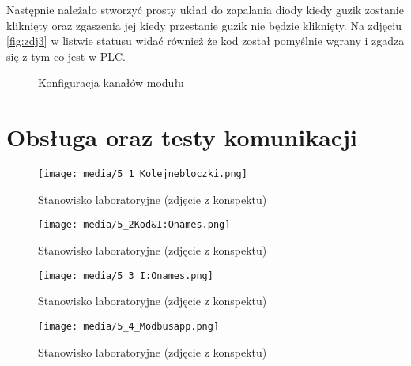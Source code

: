 \documentclass{article}
\begin{document}
\newpage
Następnie należało stworzyć prosty układ do zapalania diody kiedy guzik zostanie kliknięty oraz zgaszenia jej kiedy przestanie guzik nie będzie kliknięty. Na zdjęciu \ref{fig:zdj3} w listwie statusu widać również że kod został pomyślnie wgrany i zgadza się z tym co jest w PLC.

\begin{figure}[!ht]
    \centering
   
        \hfill
    \caption{Konfiguracja kanałów modułu}
    \label{fig:main1}
\end{figure}


\newpage
\section{Obsługa oraz testy komunikacji}

\begin{figure}[H]
    \centering
    \texttt{[image: media/5\_1\_Kolejnebloczki.png]}
    \caption{Stanowisko laboratoryjne (zdjęcie z konspektu)}
    \label{fig:zdj7}
\end{figure}


\begin{figure}[H]
    \centering
    \texttt{[image: media/5\_2Kod\&I:Onames.png]}
    \caption{Stanowisko laboratoryjne (zdjęcie z konspektu)}
    \label{fig:zdj8}
\end{figure}


\begin{figure}[H]
    \centering
    \texttt{[image: media/5\_3\_I:Onames.png]}
    \caption{Stanowisko laboratoryjne (zdjęcie z konspektu)}
    \label{fig:zdj9}
\end{figure}


\begin{figure}[H]
    \centering
    \texttt{[image: media/5\_4\_Modbusapp.png]}
    \caption{Stanowisko laboratoryjne (zdjęcie z konspektu)}
    \label{fig:zdj10}
\end{figure}
\end{document}
